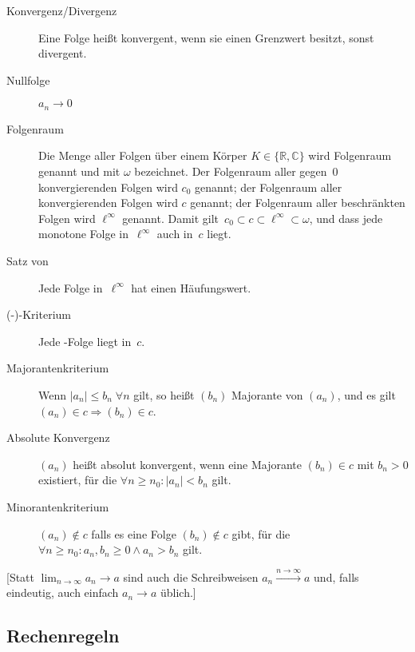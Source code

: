 \begin{description}
  \item [Konvergenz/Divergenz] 
        Eine Folge heißt konvergent, wenn sie einen Grenzwert besitzt, sonst divergent.
  \item [Nullfolge] 
        $a_n \to 0$
  \item[Folgenraum] 
        Die Menge aller Folgen über einem Körper $K \in \{\mathbb{R}, \mathbb{C}\}$ wird Folgenraum genannt und mit $\omega$ bezeichnet.
        Der Folgenraum aller gegen~$0$ konvergierenden Folgen wird $c_0$ genannt; der Folgenraum aller konvergierenden Folgen wird $c$ genannt; der Folgenraum aller beschränkten Folgen wird $\ell^\infty$ genannt.
        Damit gilt~$c_0 \subset c \subset \ell^\infty \subset \omega$, und dass jede monotone Folge in~$\ell^\infty$ auch in~$c$ liegt.
  \item [Satz von ] 
        Jede Folge in~$\ell^\infty$ hat einen Häufungswert.
  \item [(-)-Kriterium] 
        Jede -Folge liegt in~$c$.
  \item[Majorantenkriterium] 
        Wenn $\lvert a_n \rvert \leq b_n\; \forall n$ gilt, so heißt $(b_n)$ Majorante von $(a_n)$, und  es gilt $(a_n) \in c \Rightarrow (b_n) \in c$.
  \item [Absolute Konvergenz]
        $(a_n)$ heißt absolut konvergent, wenn eine Majorante $(b_n) \in c$ mit $b_n>0$ existiert, für die $\forall n\geq n_0 : \lvert a_n \rvert < b_n$ gilt.
  \item [Minorantenkriterium] 
        $(a_n) \notin c$ falls es eine Folge $(b_n) \notin c$ gibt, für die $\forall n\geq n_0 : a_n, b_n \geq 0 \land a_n  > b_n$ gilt.
\end{description}

[Statt $\lim_{n \to \infty} a_n \to a$ sind auch die Schreibweisen $a_n \xrightarrow{n\to\infty} a$ und, falls eindeutig, auch einfach $a_n \to a$ üblich.]

\subsection{Rechenregeln}

